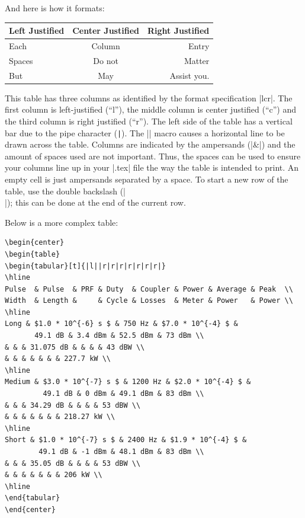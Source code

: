 And here is how it formats:

\begin{center}
\begin{tabular}{|lcr}
Left Justified & Center Justified & Right Justified \\
\hline
Each & Column & Entry \\
Spaces      & Do not    & Matter \\
But         & May       & Assist you. \\
\end{tabular}
\end{center}

This table has three columns as identified by the format specification |lcr|.
The first column is left-justified (``l''), the middle column is center
justified (``c'') and the third column is right justified (``r''). The left
side of the table has a vertical bar due to the pipe character (\verb+|+).  The
|\hline| macro causes a horizontal line to be drawn across the table.  Columns
are indicated by the ampersands (|&|) and the amount of spaces used are not
important.  Thus, the spaces can be used to ensure your columns line up in your
|.tex| file the way the table is intended to print.  An empty cell is just
ampersands separated by a space.  To start a new row of the table, use the
double backslash (|\\|); this can be done at the end of the current row.

Below is a more complex table:


\begin{Verbatim}
\begin{center}
\begin{table}
\begin{tabular}[t]{|l||r|r|r|r|r|r|r|}
\hline
Pulse  & Pulse  & PRF & Duty  & Coupler & Power & Average & Peak  \\
Width  & Length &     & Cycle & Losses  & Meter & Power   & Power \\
\hline
Long & $1.0 * 10^{-6} s $ & 750 Hz & $7.0 * 10^{-4} $ & 
       49.1 dB & 3.4 dBm & 52.5 dBm & 73 dBm \\
& & & 31.075 dB & & & & 43 dBW \\
& & & & & & & 227.7 kW \\
\hline
Medium & $3.0 * 10^{-7} s $ & 1200 Hz & $2.0 * 10^{-4} $ & 
         49.1 dB & 0 dBm & 49.1 dBm & 83 dBm \\
& & & 34.29 dB & & & & 53 dBW \\
& & & & & & & 218.27 kW \\
\hline
Short & $1.0 * 10^{-7} s $ & 2400 Hz & $1.9 * 10^{-4} $ & 
        49.1 dB & -1 dBm & 48.1 dBm & 83 dBm \\
& & & 35.05 dB & & & & 53 dBW \\
& & & & & & & 206 kW \\
\hline
\end{tabular}
\end{center}
\end{Verbatim}

